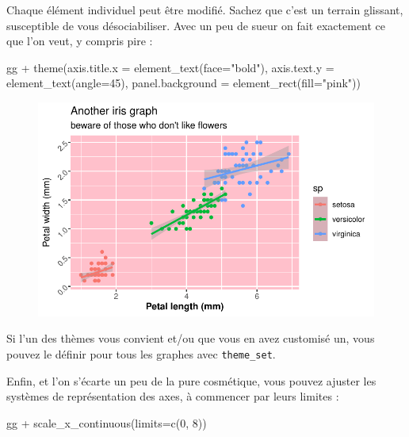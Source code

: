 \documentclass[
  letterpaper,
  DIV=11,
  numbers=noendperiod]{scrreprt}
\newenvironment{Shaded}{\begin{snugshade}}{\end{snugshade}}
\newcommand{\AttributeTok}[1]{\textcolor[rgb]{0.40,0.45,0.13}{#1}}
\newcommand{\DecValTok}[1]{\textcolor[rgb]{0.68,0.00,0.00}{#1}}
\newcommand{\FunctionTok}[1]{\textcolor[rgb]{0.28,0.35,0.67}{#1}}
\newcommand{\NormalTok}[1]{\textcolor[rgb]{0.00,0.23,0.31}{#1}}
\newcommand{\SpecialCharTok}[1]{\textcolor[rgb]{0.37,0.37,0.37}{#1}}
\newcommand{\StringTok}[1]{\textcolor[rgb]{0.13,0.47,0.30}{#1}}
\begin{document}
Chaque élément individuel peut être modifié. Sachez que c'est un terrain
glissant, susceptible de vous désociabiliser. Avec un peu de sueur on
fait exactement ce que l'on veut, y compris pire :

\begin{Shaded}
\begin{Highlighting}[]
\NormalTok{gg }\SpecialCharTok{+} \FunctionTok{theme}\NormalTok{(}\AttributeTok{axis.title.x =} \FunctionTok{element\_text}\NormalTok{(}\AttributeTok{face=}\StringTok{"bold"}\NormalTok{),}
           \AttributeTok{axis.text.y =} \FunctionTok{element\_text}\NormalTok{(}\AttributeTok{angle=}\DecValTok{45}\NormalTok{),}
           \AttributeTok{panel.background =} \FunctionTok{element\_rect}\NormalTok{(}\AttributeTok{fill=}\StringTok{"pink"}\NormalTok{))}
\end{Highlighting}
\end{Shaded}

\begin{figure}[H]

{\centering \includegraphics{ggplot2_files/figure-pdf/unnamed-chunk-18-1.pdf}

}

\end{figure}

Si l'un des thèmes vous convient et/ou que vous en avez customisé un,
vous pouvez le définir pour tous les graphes avec \texttt{theme\_set}.

Enfin, et l'on s'écarte un peu de la pure cosmétique, vous pouvez
ajuster les systèmes de représentation des axes, à commencer par leurs
limites :

\begin{Shaded}
\begin{Highlighting}[]
\NormalTok{gg }\SpecialCharTok{+} \FunctionTok{scale\_x\_continuous}\NormalTok{(}\AttributeTok{limits=}\FunctionTok{c}\NormalTok{(}\DecValTok{0}\NormalTok{, }\DecValTok{8}\NormalTok{))}
\end{Highlighting}
\end{Shaded}
\end{document}
